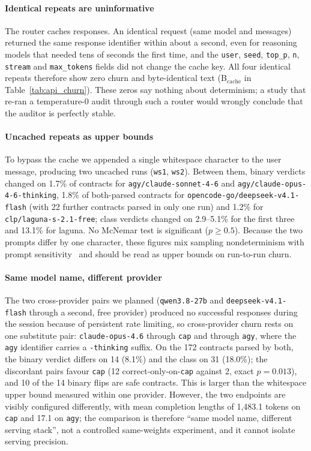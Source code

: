 

\paragraph{Identical repeats are uninformative}
The router caches responses. An identical request (same model and messages) returned the same response identifier within about a second, even for reasoning models that needed tens of seconds the first time, and the \texttt{user}, \texttt{seed}, \texttt{top\_p}, \texttt{n}, \texttt{stream} and \texttt{max\_tokens} fields did not change the cache key. All four identical repeats therefore show zero churn and byte-identical text (B$_\mathrm{cache}$ in Table~\ref{tab:api_churn}). These zeros say nothing about determinism; a study that re-ran a temperature-0 audit through such a router would wrongly conclude that the auditor is perfectly stable.

\paragraph{Uncached repeats as upper bounds}
To bypass the cache we appended a single whitespace character to the user message, producing two uncached runs (\texttt{ws1}, \texttt{ws2}). Between them, binary verdicts changed on 1.7\% of contracts for \texttt{agy/claude-sonnet-4-6} and \texttt{agy/claude-opus-4-6-thinking}, 1.8\% of both-parsed contracts for \texttt{opencode-go/deepseek-v4.1-flash} (with 22 further contracts parsed in only one run) and 1.2\% for \texttt{clp/laguna-s-2.1-free}; class verdicts changed on 2.9--5.1\% for the first three and 13.1\% for laguna. No McNemar test is significant ($p\ge0.5$). Because the two prompts differ by one character, these figures mix sampling nondeterminism with prompt sensitivity~\cite{sclar2024quantifying} and should be read as upper bounds on run-to-run churn.

\paragraph{Same model name, different provider}
The two cross-provider pairs we planned (\texttt{qwen3.8-27b} and \texttt{deepseek-v4.1-flash} through a second, free provider) produced no successful responses during the session because of persistent rate limiting, so cross-provider churn rests on one substitute pair: \texttt{claude-opus-4.6} through \texttt{cap} and through \texttt{agy}, where the \texttt{agy} identifier carries a \texttt{-thinking} suffix. On the 172 contracts parsed by both, the binary verdict differs on 14 (8.1\%) and the class on 31 (18.0\%); the discordant pairs favour \texttt{cap} (12 correct-only-on-\texttt{cap} against 2, exact $p=0.013$), and 10 of the 14 binary flips are safe contracts. This is larger than the whitespace upper bound measured within one provider. However, the two endpoints are visibly configured differently, with mean completion lengths of 1{,}483.1 tokens on \texttt{cap} and 17.1 on \texttt{agy}; the comparison is therefore ``same model name, different serving stack'', not a controlled same-weights experiment, and it cannot isolate serving precision.

